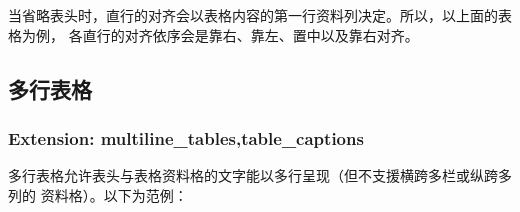 \documentclass[fancyhdr,bookmark]{ctexbook}
\begin{document}
当省略表头时，直行的对齐会以表格内容的第一行资料列决定。所以，以上面的表格为例，
各直行的对齐依序会是靠右、靠左、置中以及靠右对齐。

\hypertarget{ux591aux884cux8868ux683c}{%
\subsection{多行表格}\label{ux591aux884cux8868ux683c}}

\hypertarget{extension-multiline_tablestable_captions}{%
\subsubsection{Extension:
multiline\_tables,table\_captions}\label{extension-multiline_tablestable_captions}}

多行表格允许表头与表格资料格的文字能以多行呈现（但不支援横跨多栏或纵跨多列的
资料格）。以下为范例：
\end{document}
